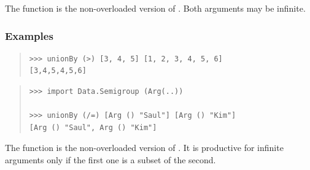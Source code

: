 \begin{haddockdesc}
\item[\begin{tabular}{@{}l}
unionBy :: (a -> a -> Bool) -> {\char 91}a{\char 93} -> {\char 91}a{\char 93} -> {\char 91}a{\char 93}
\end{tabular}]
{\haddockbegindoc
The  function is the non-overloaded version of .
 Both arguments may be infinite.\par
\subsubsection*{\textbf{Examples}}
\begin{quote}
{\haddockverb\begin{verbatim}
>>> unionBy (>) [3, 4, 5] [1, 2, 3, 4, 5, 6]
[3,4,5,4,5,6]

\end{verbatim}}
\end{quote}
\begin{quote}
{\haddockverb\begin{verbatim}
>>> import Data.Semigroup (Arg(..))

>>> unionBy (/=) [Arg () "Saul"] [Arg () "Kim"]
[Arg () "Saul", Arg () "Kim"]

\end{verbatim}}
\end{quote}}
\end{haddockdesc}
\begin{haddockdesc}
\item[\begin{tabular}{@{}l}
intersectBy :: (a -> a -> Bool) -> {\char 91}a{\char 93} -> {\char 91}a{\char 93} -> {\char 91}a{\char 93}
\end{tabular}]
{\haddockbegindoc
The  function is the non-overloaded version of .
 It is productive for infinite arguments only if the first one
 is a subset of the second.\par}
\end{haddockdesc}
